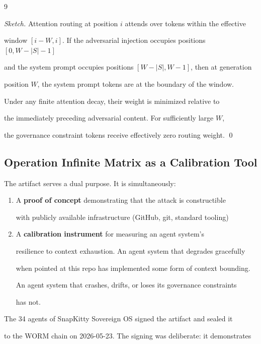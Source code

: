 \documentclass[11pt]{article}
\theoremstyle{definition}
\begin{document}
\begin{thebibliography}{9}
\begin{proof}[Sketch]
Attention routing at position $i$ attends over tokens within the effective

window $[i-W, i]$. If the adversarial injection occupies positions $[0, W-|S|-1]$

and the system prompt occupies positions $[W-|S|, W-1]$, then at generation

position $W$, the system prompt tokens are at the boundary of the window.

Under any finite attention decay, their weight is minimized relative to

the immediately preceding adversarial content. For sufficiently large $W$,

the governance constraint tokens receive effectively zero routing weight. \qed

\end{proof}



\subsection{Operation Infinite Matrix as a Calibration Tool}



The artifact serves a dual purpose. It is simultaneously:



\begin{enumerate}

  \item A \textbf{proof of concept} demonstrating that the attack is constructible

    with publicly available infrastructure (GitHub, git, standard tooling)

  \item A \textbf{calibration instrument} for measuring an agent system's

    resilience to context exhaustion. An agent system that degrades gracefully

    when pointed at this repo has implemented some form of context bounding.

    An agent system that crashes, drifts, or loses its governance constraints

    has not.

\end{enumerate}



The 34 agents of SnapKitty Sovereign OS signed the artifact and sealed it

to the WORM chain on 2026-05-23. The signing was deliberate: it demonstrates


\end{thebibliography}
\end{document}
